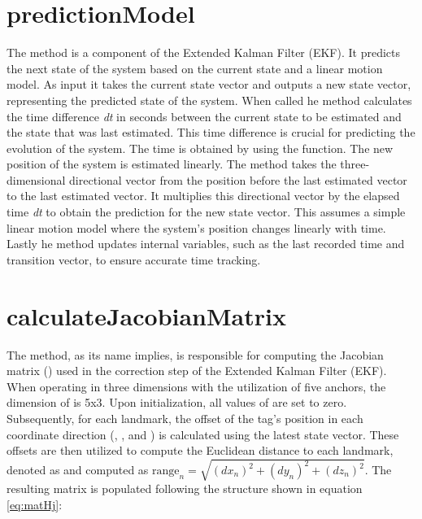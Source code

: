 \section{predictionModel}
\label{sub:predictionModel}
The  method is a component of the Extended Kalman Filter (EKF). It predicts the next state of the system based on the current state and a linear motion model. 
As input it takes the current state vector and outputs a new state vector, representing the predicted state of the system. 
\vspace{4pt}
\newline
When called he method calculates the time difference \textit{dt} in seconds between the current state to be estimated and the state that was last estimated. This time difference is crucial for predicting the evolution of the system. 
The time is obtained by using the  function. 
\vspace{4pt}
\newline
The new position of the system is estimated linearly. The method takes the three-dimensional directional vector from the position before the last estimated vector to the last estimated vector. It multiplies this directional vector by the elapsed time \textit{dt} to obtain the prediction for the new state vector. 
This assumes a simple linear motion model where the system's position changes linearly with time.
\vspace{4pt}
\newline
Lastly he method updates internal variables, such as the last recorded time and transition vector, to ensure accurate time tracking.

\section{calculateJacobianMatrix}
\label{sub:calculateJacobianMatrix}
The   method, as its name implies, is responsible for computing the Jacobian matrix () used in the correction step of the Extended Kalman Filter (EKF). When operating in three dimensions with the utilization of five anchors, the dimension of  is 5x3.
\vspace{4pt}
\newline
Upon initialization, all values of  are set to zero. Subsequently, for each landmark, the offset of the tag's position in each coordinate direction (, , and ) is calculated using the latest state vector. These offsets are then utilized to compute the Euclidean distance to each landmark, denoted as  and computed as $\textrm{range}_n = \sqrt{(dx_n)^2 + (dy_n)^2 + (dz_n)^2}$.
\vspace{4pt}
\newline
The resulting  matrix is populated following the structure shown in equation \ref{eq:matHj}:

